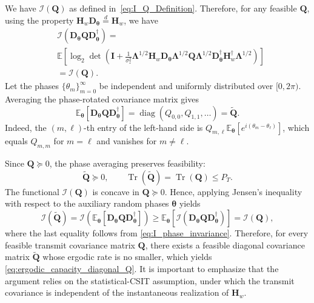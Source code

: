 \documentclass[lettersize,journal]{IEEEtran}
\theoremstyle{plain}
\begin{document}
We have $\mathcal{I}(\mathbf{Q})$ as defined in~\eqref{eq:I_Q_Definition}. Therefore, for any feasible $\mathbf{Q}$, using the property $\mathbf{H}_w\mathbf{D}_{\boldsymbol{\theta}}
\overset{d}{=}
\mathbf{H}_w$, we have
\begin{align}
	&\mathcal{I}
	\left(
	\mathbf{D}_{\boldsymbol{\theta}}
	\mathbf{Q}
	\mathbf{D}_{\boldsymbol{\theta}}^{\dagger}
	\right) =
	\nonumber\\
	&
	\mathbb{E}
	\left[
	\log_2\det
	\left(
	\mathbf{I}
	+
	\frac{1}{\sigma_z^2}
	\boldsymbol{\Lambda}^{1/2}
	\mathbf{H}_w
	\mathbf{D}_{\boldsymbol{\theta}}
	\boldsymbol{\Lambda}^{1/2}
	\mathbf{Q}
	\boldsymbol{\Lambda}^{1/2}
	\mathbf{D}_{\boldsymbol{\theta}}^{\dagger}
	\mathbf{H}_w^{\dagger}
	\boldsymbol{\Lambda}^{1/2}
	\right)
	\right]
	\nonumber\\
	&=
	\mathcal{I}(\mathbf{Q}).
	\label{eq:I_phase_invariance}
\end{align}
Let the phases $\{\theta_m\}_{m=0}^{\infty}$ be independent and
uniformly distributed over $[0,2\pi)$. Averaging the phase-rotated
covariance matrix gives
$$
	\mathbb{E}_{\boldsymbol{\theta}}
	\left[
	\mathbf{D}_{\boldsymbol{\theta}}\mathbf{Q}
	\mathbf{D}_{\boldsymbol{\theta}}^{\dagger}
	\right]
	=
	\operatorname{diag}(Q_{0,0},Q_{1,1},\ldots)
	=
	\widetilde{\mathbf{Q}}.
	\label{eq:Q_phase_average}
$$
Indeed, the $(m,\ell)$-th entry of the left-hand side is $Q_{m,\ell}
\mathbb{E}_{\boldsymbol{\theta}}
\left[
e^{i(\theta_m-\theta_\ell)}
\right]$, which equals $Q_{m,m}$ for $m=\ell$ and vanishes for
$m\neq\ell$.

Since $\mathbf{Q}\succeq0$, the phase averaging preserves feasibility:
$$
	\widetilde{\mathbf{Q}}\succeq0,
	\qquad
	\operatorname{Tr}(\widetilde{\mathbf{Q}})
	=
	\operatorname{Tr}(\mathbf{Q})
	\leq P_T.
	\label{eq:Q_tilde_feasible}
$$
The functional $\mathcal{I}(\mathbf{Q})$ is concave in
$\mathbf{Q}\succeq0$. Hence, applying Jensen's inequality with
respect to the auxiliary random phases $\boldsymbol{\theta}$ yields
$$
	\mathcal{I}(\tilde{\mathbf{Q}}) = \mathcal{I}
	\left(
	\mathbb{E}_{\boldsymbol{\theta}}
	\left[
	\mathbf{D}_{\boldsymbol{\theta}}
	\mathbf{Q}
	\mathbf{D}_{\boldsymbol{\theta}}^{\dagger}
	\right]
	\right) \geq
	\mathbb{E}_{\boldsymbol{\theta}}
	\left[
	\mathcal{I}
	\left(
	\mathbf{D}_{\boldsymbol{\theta}}
	\mathbf{Q}
	\mathbf{D}_{\boldsymbol{\theta}}^{\dagger}
	\right)
	\right]
	=
	\mathcal{I}(\mathbf{Q}),
	\label{eq:Q_diagonalization}
$$
where the last equality follows from \eqref{eq:I_phase_invariance}.
Therefore, for every feasible transmit covariance matrix $\mathbf{Q}$,
there exists a feasible diagonal covariance matrix
$\widetilde{\mathbf{Q}}$ whose ergodic rate is no smaller, which
yields \eqref{eq:ergodic_capacity_diagonal_Q}. It is important to emphasize that the argument relies on
the statistical-CSIT assumption, under which the transmit covariance
is independent of the instantaneous realization of $\mathbf{H}_w$. 
\end{document}
